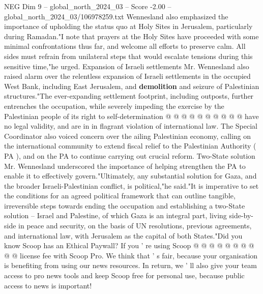 \begin{textsample}{NEG Dim 9 – global\_north\_2024\_03 – Score -2.00 – global\_north\_2024\_03/106978259.txt}
Wennesland also emphasized the importance of upholding the status quo at Holy Sites in Jerusalem, particularly during Ramadan."I note that prayers at the Holy Sites have proceeded with some minimal confrontations thus far, and welcome all efforts to preserve calm.
All sides must refrain from unilateral steps that would escalate tensions during this sensitive time,"he urged.
Expansion of Israeli settlements Mr.
Wennesland also raised alarm over the relentless expansion of Israeli settlements in the occupied West Bank, including East Jerusalem, and \textbf{demolition} and seizure of Palestinian structures."The ever-expanding settlement footprint, including outposts, further entrenches the occupation, while severely impeding the exercise by the Palestinian people of its right to self-determination @ @ @ @ @ @ @ @ @ @ have no legal validity, and are in in flagrant violation of international law.
The Special Coordinator also voiced concern over the ailing Palestinian economy, calling on the international community to extend fiscal relief to the Palestinian Authority ( PA ), and on the PA to continue carrying out crucial reform.
Two-State solution Mr.
Wennesland underscored the importance of helping strengthen the PA to enable it to effectively govern."Ultimately, any substantial solution for Gaza, and the broader Israeli-Palestinian conflict, is political,"he said."It is imperative to set the conditions for an agreed political framework that can outline tangible, irreversible steps towards ending the occupation and establishing a two-State solution -- Israel and Palestine, of which Gaza is an integral part, living side-by-side in peace and security, on the basis of UN resolutions, previous agreements, and international law, with Jerusalem as the capital of both States."Did you know Scoop has an Ethical Paywall?
If you ' re using Scoop @ @ @ @ @ @ @ @ @ @ license fee with Scoop Pro.
We think that ' s fair, because your organisation is benefiting from using our news resources.
In return, we ' ll also give your team access to pro news tools and keep Scoop free for personal use, because public access to news is important!

\end{textsample}
